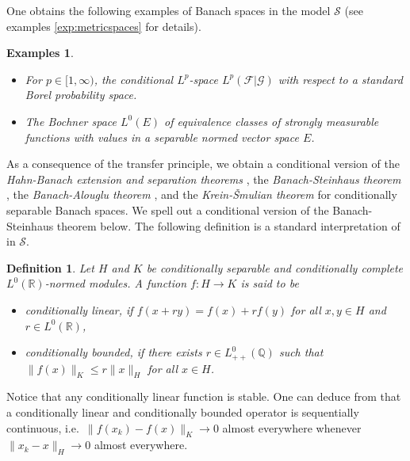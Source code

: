 \documentclass{jloganal}
\numberwithin{equation}{section}
\theoremstyle{plain}
\newtheorem{definition}[subsection]{Definition}
\newtheorem{remark}[subsection]{Remark}
\newtheorem{examples}[subsection]{Examples}
\renewcommand{\leq}{\leqslant}
\renewcommand\R{\mathbb{R}}
\begin{document}
One obtains the following examples of Banach spaces in the model $\mathcal{S}$ (see examples \ref{exp:metricspaces} for details). 
\begin{examples}
\begin{itemize}
\item[a)]  For $p\in [1,\infty)$, the conditional $L^p$-space $L^p(\mathcal{F}|\mathcal{G})$ with respect to a standard Borel probability space. 
\item[b)] The Bochner space $L^0(E)$ of equivalence classes of strongly measurable functions  with values in a separable normed vector space $E$.  
\end{itemize}
\end{examples}
As a consequence of the transfer principle, we obtain a conditional version of the 
 \emph{Hahn-Banach extension and separation theorems} \cite[Theorems IV.9.3, X.2.1]{simpson2009subsystems}, the \emph{Banach-Steinhaus theorem} \cite[Theorem II.10.8]{simpson2009subsystems}, the \emph{Banach-Alouglu theorem} \cite[Remark X.2.4]{simpson2009subsystems}, and the \emph{Krein-\v{S}mulian theorem} \cite[Theorem  X.2.7]{simpson2009subsystems} for conditionally separable Banach spaces. 
 We spell out a conditional version of the Banach-Steinhaus theorem below.  
The following definition is a standard interpretation of \cite[Definition II.10.5]{simpson2009subsystems} in $\mathcal{S}$. 
\begin{definition}
Let $H$ and $K$ be conditionally separable and conditionally complete $L^0(\R)$-normed modules. 
A function $f\colon H\to K$ is said to be 
\begin{itemize}
\item \emph{conditionally linear}, if $f(x + ry)=f(x)+ rf(y)$ for all $x,y\in H$ and $r\in L^0(\mathbb{R})$, 
\item \emph{conditionally bounded}, if there exists $r\in L^0_{++}(\mathbb{Q})$ such that $\|f(x)\|_K\leq r \|x\|_H$ for all $x\in H$.
\end{itemize}  
\end{definition}
Notice that any conditionally linear function is stable.  
One can deduce from \cite[Theorem II.10.7]{simpson2009subsystems} that a conditionally linear and conditionally bounded operator is sequentially continuous, i.e.~$\|f(x_k)-f(x)\|_K\to 0$ almost everywhere whenever $\|x_k-x\|_H\to 0$ almost everywhere. 
\end{document}
